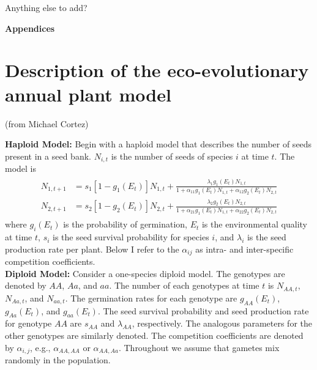 \documentclass[11pt]{article}
\begin{document}
Anything else to add?

\newpage
\renewcommand{\refname}{Literature cited}





\clearpage 
\newpage 

\setcounter{page}{1}
\setcounter{equation}{0}
\setcounter{figure}{0}
\setcounter{section}{0}
\setcounter{table}{0}

\centerline{\Large \textbf{Appendices}}

\vspace{0.4in} 

\renewcommand{\theequation}{A-\arabic{equation}}
\renewcommand{\thetable}{A-\arabic{table}}
\renewcommand{\thefigure}{A-\arabic{figure}}
\renewcommand{\thesection}{\Alph{section}}

\section{Description of the eco-evolutionary annual plant model}

(from Michael Cortez)

\noindent \textbf{Haploid Model:} Begin with a haploid model that describes the number of seeds present in a seed bank.  $N_{i,t}$ is the number of seeds of species $i$ at time $t$.  The model is
\begin{align}\begin{split}
N_{1,t+1} &= s_1 [1-g_1(E_t)]N_{1,t}+\frac{\lambda_1g_1(E_t)N_{1,t}}{1+ \alpha_{11}g_1(E_t)N_{1,t} + \alpha_{12}g_2(E_t)N_{2,t}}\\
N_{2,t+1} &= s_2 [1-g_2(E_t)]N_{2,t}+\frac{\lambda_2g_2(E_t)N_{2,t}}{1+ \alpha_{21}g_1(E_t)N_{1,t} + \alpha_{22}g_2(E_t)N_{2,t}}
\end{split}\end{align}
where $g_{i}(E_t)$ is the probability of germination, $E_t$ is the environmental quality at time $t$, $s_i$ is the seed survival probability for species $i$, and $\lambda_i$ is the seed production rate per plant.  Below I refer to the $\alpha_{ij}$ as intra- and inter-specific competition coefficients.  \\

\noindent \textbf{Diploid Model:} Consider a one-species diploid model.  The genotypes are denoted by $AA$, $Aa$, and $aa$.   The number of each genotypes at time $t$ is $N_{AA,t}$, $N_{Aa,t}$, and $N_{aa,t}$.  The germination rates for each genotype are $g_{AA}(E_t)$, $g_{Aa}(E_t)$, and $g_{aa}(E_t)$.  The seed survival probability and seed production rate for genotype $AA$ are $s_{AA}$ and $\lambda_{AA}$, respectively.  The analogous parameters for the other genotypes are similarly denoted.  The competition coefficients are denoted by $\alpha_{i,j}$, e.g., $\alpha_{AA,AA}$ or $\alpha_{AA,Aa}$.  Throughout we assume that gametes mix randomly in the population.  
\end{document}
